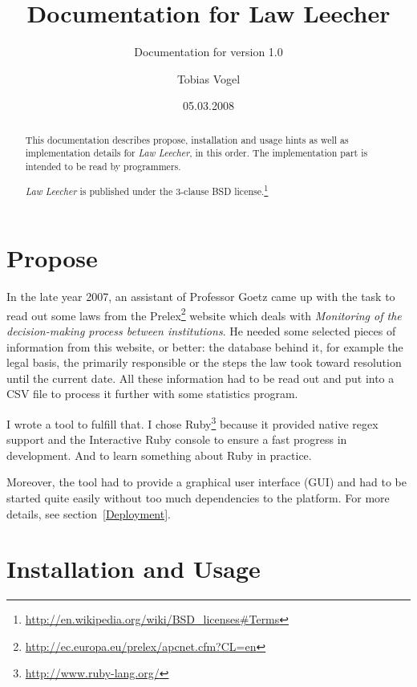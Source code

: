 \documentclass{scrartcl}
\title{Documentation for Law Leecher}
\subtitle{Documentation for version 1.0}
\author{Tobias Vogel}
\date{05.03.2008}
\begin{document}
\maketitle

\begin{abstract}
This documentation describes propose, installation and usage hints as well as implementation details for \textit{Law Leecher}, in this order. The implementation part is intended to be read by programmers.

\textit{Law Leecher} is published under the 3-clause BSD license.\footnote{\url{http://en.wikipedia.org/wiki/BSD_licenses#Terms}}
\end{abstract}


\tableofcontents

\section{Propose}
In the late year 2007, an assistant of Professor Goetz came up with the task to read out some laws from the Prelex\footnote{\url{http://ec.europa.eu/prelex/apcnet.cfm?CL=en}} website which deals with \textit{Monitoring of the decision-making process between institutions}. He needed some selected pieces of information from this website, or better: the database behind it, for example the legal basis, the primarily responsible or the steps the law took toward resolution until the current date. All these information had to be read out and put into a CSV file to process it further with some statistics program.

I wrote a tool to fulfill that. I chose Ruby\footnote{\url{http://www.ruby-lang.org/}} because it provided native regex support and the Interactive Ruby console to ensure a fast progress in development. And to learn something about Ruby in practice.

Moreover, the tool had to provide a graphical user interface (GUI) and had to be started quite easily without too much dependencies to the platform. For more details, see section~\ref{Deployment}.



\section{Installation and Usage}
\end{document}
